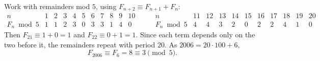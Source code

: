 Work with remainders mod $5$, using $F_{n+2}\equiv F_{n+1}+F_n$:
\[\begin{array}{c|cccccccccc}
n&1&2&3&4&5&6&7&8&9&10\\\hline
F_n\bmod5&1&1&2&3&0&3&3&1&4&0
\end{array}\qquad
\begin{array}{c|cccccccccc}
n&11&12&13&14&15&16&17&18&19&20\\\hline
F_n\bmod5&4&4&3&2&0&2&2&4&1&0
\end{array}\]
Then $F_{21}\equiv1+0=1$ and $F_{22}\equiv0+1=1$. Since each term depends only on the two before it, the remainders repeat with period $20$. As $2006=20\cdot100+6$,
\[F_{2006}\equiv F_6=8\equiv\boxed{3}\pmod5.\]

